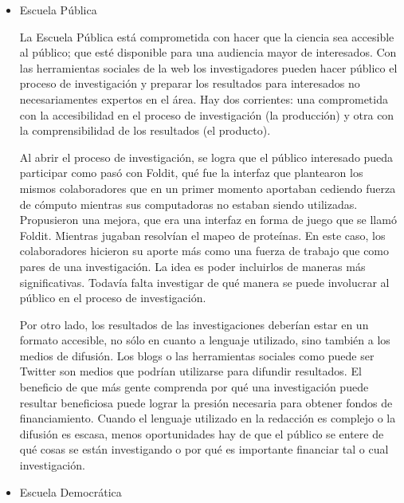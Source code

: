 \begin{itemize}
	\item {Escuela Pública}
	
	La Escuela Pública está comprometida con hacer que la ciencia sea accesible al público; que esté disponible para una audiencia mayor de interesados. Con las herramientas sociales de la web los investigadores pueden hacer público el proceso de investigación y preparar los resultados para interesados no necesariamentes expertos en el área. Hay dos corrientes: una comprometida con la accesibilidad en el proceso de investigación (la producción) y otra con la comprensibilidad de los resultados (el producto).
	
	Al abrir el proceso de investigación, se logra que el público interesado pueda participar como pasó con Foldit, qué fue la interfaz que plantearon los mismos colaboradores que en un primer momento aportaban cediendo fuerza de cómputo mientras sus computadoras no estaban siendo utilizadas. Propusieron una mejora, que era una interfaz en forma de juego que se llamó Foldit. Mientras jugaban resolvían el mapeo de proteínas. En este caso, los colaboradores hicieron su aporte más como una fuerza de trabajo que como pares de una investigación. La idea es poder incluirlos de maneras más significativas. Todavía falta investigar de qué manera se puede involucrar al público en el proceso de investigación.
	
	Por otro lado, los resultados de las investigaciones deberían estar en un formato accesible, no sólo en cuanto a lenguaje utilizado, sino también a los medios de difusión. Los blogs o las herramientas sociales como puede ser Twitter son medios que podrían utilizarse para difundir resultados. El beneficio de que más gente comprenda por qué una investigación puede resultar beneficiosa puede lograr la presión necesaria para obtener fondos de financiamiento. Cuando el lenguaje utilizado en la redacción es complejo o la difusión es escasa, menos oportunidades hay de que el público se entere de qué cosas se están investigando o por qué es importante financiar tal o cual investigación.

	\item {Escuela Democrática}
	\begin{itemize}
	

\end{itemize}
\end{itemize}
